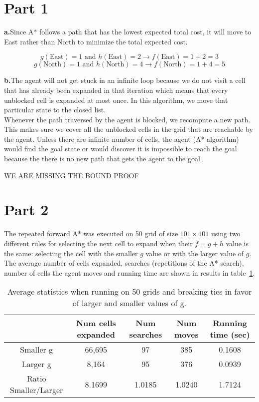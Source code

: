 \documentclass{article}
\begin{document}
\section*{Part 1}
\textbf{a.}\quad Since A* follows a path that has the lowest expected total cost, it will move to East rather than North to minimize the total expected cost. 

$$g(\text{East})=1 \text{ and } h(\text{East}) = 2 \rightarrow f(\text{East})=1+2=3 $$
$$ g(\text{North})=1 \text{ and } h(\text{North})=4 \rightarrow f(\text{North})=1+4=5 $$

\textbf{b.}\quad The agent will not get stuck in an infinite loop because we do not visit a cell that has already been expanded in that iteration which means that every unblocked cell is expanded at most once. In this algorithm, we move that particular state to the closed list.\\
Whenever the path traversed by the agent is blocked, we recompute a new path. This makes sure we cover all the unblocked cells in the grid that are reachable by the agent. Unless there are infinite number of cells, the agent (A* algorithm) would find the goal state or would discover it is impossible to reach the goal because the there is no new path that gets the agent to the goal.

{\huge{WE ARE MISSING THE BOUND PROOF}}


\section*{Part 2}

The repeated forward A* was executed on 50 grid of size $101 \times 101$ using two different rules for selecting the next cell to expand when their $f = g + h$ value is the same: selecting the cell with the smaller $g$ value or with the larger value of $g$. The average number of cells expanded, searches (repetitions of the A* search), number of cells the agent moves and running time are shown in results in table~\ref{tab:comp_g}.

\begin{table}[ht]
  \begin{center}
    \begin{tabular}{|*{5}{c|}}
      \cline{2-5}
      \multicolumn{1}{c|}{} & Num cells expanded & Num searches & Num moves & Running time (sec) \\ \hline
      Smaller g & 66,695  & 97 & 385 & 0.1608\\ \hline 
      Larger g & 8,164  & 95 & 376 & 0.0939 \\ \hline \hline
      Ratio Smaller/Larger & 8.1699&1.0185&1.0240&1.7124 \\ \hline
    \end{tabular}
  \end{center}
  \caption{Average statistics when running on 50 grids and breaking ties in favor of larger and smaller values of g.}
  \label{tab:comp_g}
\end{table}
\end{document}
